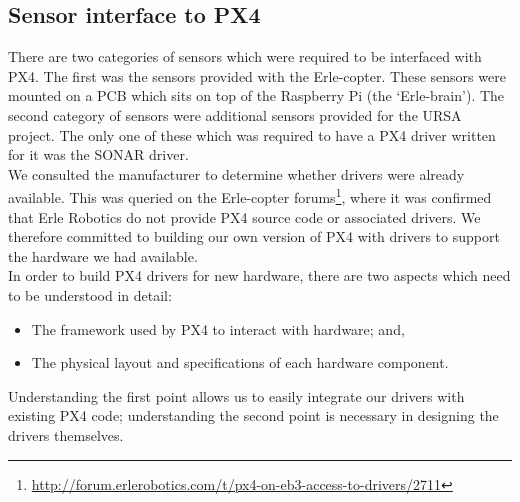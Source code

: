 \documentclass[capstone_report.tex]{subfiles}
\begin{document}
    \subsection{Sensor interface to PX4}
    There are two categories of sensors which were required to be interfaced with PX4. The first was the sensors provided with the Erle-copter. These sensors were mounted on a PCB which sits on top of the Raspberry Pi (the `Erle-brain'). The second category of sensors were additional sensors provided for the URSA project. The only one of these which was required to have a PX4 driver written for it was the SONAR driver.\\

    We consulted the manufacturer to determine whether drivers were already available. This was queried on the Erle-copter forums\footnote{\url{http://forum.erlerobotics.com/t/px4-on-eb3-access-to-drivers/2711}}, where it was confirmed that Erle Robotics do not provide PX4 source code or associated drivers. We therefore committed to building our own version of PX4 with drivers to support the hardware we had available.\\

    In order to build PX4 drivers for new hardware, there are two aspects which need to be understood in detail:
    \begin{itemize}
        \item The framework used by PX4 to interact with hardware; and,
        \item The physical layout and specifications of each hardware component.
    \end{itemize}

    Understanding the first point allows us to easily integrate our drivers with existing PX4 code; understanding the second point is necessary in designing the drivers themselves.\\
\end{document}
